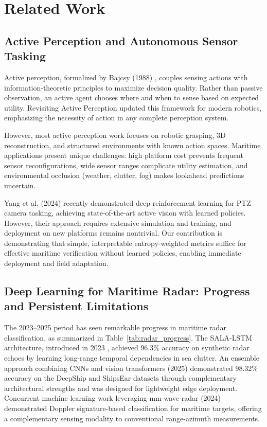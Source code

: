 \documentclass[conf]{asmeconf}
\begin{document}
\section{Related Work}

\subsection{Active Perception and Autonomous Sensor Tasking}

Active perception, formalized by Bajcsy (1988) \cite{Bajcsy1988ActivePerception}, couples sensing actions with information-theoretic principles to maximize decision quality. Rather than passive observation, an active agent chooses where and when to sense based on expected utility. Revisiting Active Perception \cite{BajcsyAloimonosTsotsos2016Revisiting} updated this framework for modern robotics, emphasizing the necessity of action in any complete perception system.

However, most active perception work focuses on robotic grasping, 3D reconstruction, and structured environments with known action spaces. Maritime applications present unique challenges: high platform cost prevents frequent sensor reconfigurations, wide sensor ranges complicate utility estimation, and environmental occlusion (weather, clutter, fog) makes lookahead predictions uncertain.

Yang et al. (2024) \cite{Yang2024PTZRL} recently demonstrated deep reinforcement learning for PTZ camera tasking, achieving state-of-the-art active vision with learned policies. However, their approach requires extensive simulation and training, and deployment on new platforms remains nontrivial. Our contribution is demonstrating that simple, interpretable entropy-weighted metrics suffice for effective maritime verification without learned policies, enabling immediate deployment and field adaptation.

\subsection{Deep Learning for Maritime Radar: Progress and Persistent Limitations}

The 2023--2025 period has seen remarkable progress in maritime radar classification, as summarized in Table~\ref{tab:radar_progress}. The SALA-LSTM architecture, introduced in 2023 \cite{Wang2023SALALSTM}, achieved 96.3\% accuracy on synthetic radar echoes by learning long-range temporal dependencies in sea clutter. An ensemble approach combining CNNs and vision transformers (2025) \cite{Cao2025VesselCNN} demonstrated 98.32\% accuracy on the DeepShip and ShipsEar datasets through complementary architectural strengths and was designed for lightweight edge deployment. Concurrent machine learning work leveraging mm-wave radar (2024) \cite{Rahman2024RadarClassification} demonstrated Doppler signature-based classification for maritime targets, offering a complementary sensing modality to conventional range-azimuth measurements.
\end{document}
